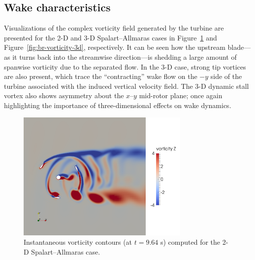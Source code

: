 \documentclass[aip,graphicx]{revtex4-1}
\begin{document}
\subsection{Wake characteristics}

Visualizations of the complex vorticity field generated by the turbine are
presented for the 2-D and 3-D Spalart--Allmaras cases in
Figure~\ref{fig:br-vorticity-2d} and Figure~\ref{fig:br-vorticity-3d},
respectively. It can be seen how the upstream blade---as it turns back into the
streamwise direction---is shedding a large amount of spanwise vorticity due to
the separated flow. In the 3-D case, strong tip vortices are also present, which
trace the ``contracting'' wake flow on the $-y$ side of the turbine associated
with the induced vertical velocity field. The 3-D dynamic stall vortex also
shows asymmetry about the $x$--$y$ mid-rotor plane; once again highlighting the
importance of three-dimensional effects on wake dynamics.

\begin{figure}
    \centering

    \includegraphics[width=0.75\textwidth]{2D_vorticity_SA_964}

    \caption{Instantaneous vorticity contours (at $t=9.64$ s) computed for the
        2-D Spalart--Allmaras case.}

    \label{fig:br-vorticity-2d}
\end{figure}
\end{document}
